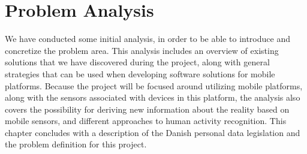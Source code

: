 
\chapter{Problem Analysis}
\label{cha:problem_analysis}

We have conducted some initial analysis, in order to be able to introduce and concretize the problem area. This analysis includes an overview of existing solutions that we have discovered during the project, along with general strategies that can be used when developing software solutions for mobile platforms. Because the project will be focused around utilizing mobile platforms, along with the sensors associated with devices in this platform, the analysis also covers the possibility for deriving new information about the reality based on mobile sensors, and different approaches to human activity recognition. This chapter concludes with a description of the Danish personal data legislation and the problem definition for this project.












